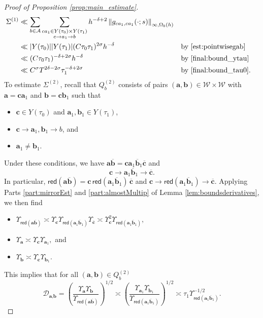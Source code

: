 \documentclass[10pt,a4paper]{amsart}
\newcommand{\Aa}{\textbf{a}}
\newcommand{\Bb}{\textbf{b}}
\newcommand{\Cc}{\textbf{c}}
\begin{document}
\begin{proof}[Proof of Proposition \ref{prop:main_estimate}]
\begin{align}
\Sigma^{(1)} &\ll \sum_{b\in \mathcal{A}}  
\sum_{\substack{ \Cc \Aa_1 \in Y(\tau_0)\times Y(\tau_1)  \\ 
\Cc \to \Aa_1 \to b
}} h^{-\delta + 2} \left\Vert g_{\Cc \Aa_1, \Cc \Aa_1}(\cdot;s) \right\Vert_{\infty,\Omega_b(h)}   \\
&\ll \vert Y(\tau_0)\vert \vert Y(\tau_1)\vert (C \tau_0\tau_1)^{2\sigma} h^{-\delta} &&\text{by \eqref{est:pointwisegab}}\\
&\ll ( C\tau_0 \tau_1 )^{-\delta + 2\sigma} h^{-\delta}&&\text{by \eqref{final:bound_ytau}} \\
&\ll C^\sigma T^{2\delta-2 \sigma} \tau_1 ^{-\delta + 2\sigma} &&\text{by \eqref{final:bound_tau0}} \label{final1}.
\end{align}
To estimate $\Sigma^{(2)}$, recall that $Q_b^{(2)}$ consists of pairs $(\Aa,\Bb)\in \mathcal{W}\times \mathcal{W}$ with $\Aa=\Cc\Aa_1$ and $\Bb=\Cc\Bb_1$ such that
\begin{itemize}
\item $\Cc\in Y(\tau_0)$ and $\Aa_1, \Bb_1 \in Y(\tau_1)$,
\item $\Cc \to \Aa_1, \Bb_1 \to b$, and
\item $\Aa_1\neq \Bb_1$.
\end{itemize}
Under these conditions, we have $\Aa \overline{\Bb} = \Cc\Aa_1 \overline{\Bb}_1 \overline{\Cc}$ and
$$
\Cc \to \Aa_1 \overline{\Bb}_1 \to \overline{\Cc}.
$$
In particular, $\mathsf{red}(\Aa\overline{\Bb}) = \Cc \, \mathsf{red}( \Aa_1 \overline{\Bb}_1 )\, \overline{\Cc}$ and $\Cc \to \mathsf{red}( \Aa_1 \overline{\Bb}_1 )\to \overline{\Cc}$. Applying Parts \eqref{part:mirrorEst} and \eqref{part:almostMultip} of Lemma \ref{lem:boundsderivatives}, we then find
\begin{itemize}
\item $\Upsilon_{\mathsf{red}(\Aa\overline{\Bb})}  \asymp \Upsilon_{\Cc} \Upsilon_{\mathsf{red}(\Aa_1 \overline{\Bb}_1)} \Upsilon_{\overline{\Cc}} \asymp \Upsilon_\Cc^2 \Upsilon_{\mathsf{red}(\Aa_1 \overline{\Bb}_1)} , $
\item $\Upsilon_{\Aa} \asymp \Upsilon_\Cc  \Upsilon_{\Aa_1},$ and
\item $\Upsilon_{\Bb} \asymp \Upsilon_\Cc  \Upsilon_{\Bb_1}.$
\end{itemize}
This implies that for all $(\Aa,\Bb)\in Q_b^{(2)}$
\begin{equation}\label{final:bound_Dab}
\mathcal{D}_{\Aa,\Bb} = \left(  \frac{\Upsilon_{\Aa} \Upsilon_{\Bb} }{\Upsilon_{\mathsf{red}(\Aa\overline{\Bb})}}\right)^{1/2} \asymp \left(  \frac{  \Upsilon_{\Aa_1} \Upsilon_{\Bb_1} }{  \Upsilon_{\mathsf{red}(\Aa_1 \overline{\Bb}_1)}  }\right)^{1/2} \asymp \tau_1 \Upsilon_{\mathsf{red}(\Aa_1 \overline{\Bb}_1)}^{-1/2}.

\end{equation}
\end{proof}
\end{document}
